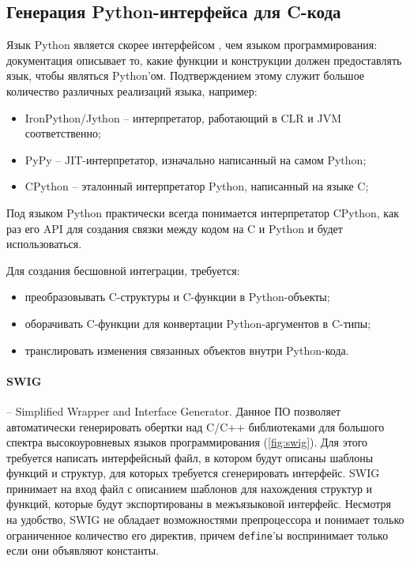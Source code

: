 \subsection{Генерация Python-интерфейса для C-кода}\label{sec:ch2/sec2/sub3/sub1}

Язык Python является скорее интерфейсом \cite{python-is-interface}, чем языком программирования:
документация описывает то, какие функции и конструкции должен предоставлять язык, чтобы являться Python'ом.
Подтверждением этому служит большое количество различных реализаций языка, например:
\begin{itemize}
    \item IronPython/Jython -- интерпретатор, работающий в CLR и JVM соответственно;
    \item PyPy -- JIT-интерпретатор, изначально написанный на самом Python;
    \item CPython \cite{cpython} -- эталонный интерпретатор Python, написанный на языке C;
\end{itemize}

Под языком Python практически всегда понимается интерпретатор CPython, как раз его
API для создания связки между кодом на C и Python и будет использоваться.

Для создания бесшовной интеграции, требуется:
\begin{itemize}
    \item преобразовывать C-структуры и C-функции в Python-объекты;
    \item оборачивать C-функции для конвертации Python-аргументов в C-типы;
    \item транслировать изменения связанных объектов внутри Python-кода.
\end{itemize}

\paragraph{SWIG} \cite{swig} --  Simplified Wrapper and Interface Generator.
Данное ПО позволяет автоматически генерировать обертки над C/C++ библиотеками для
большого спектра высокоуровневых языков программирования (\cref{fig:swig}).
Для этого требуется написать интерфейсный файл, в котором будут описаны шаблоны
функций и структур, для которых требуется сгенерировать интерфейс.
SWIG принимает на вход файл с описанием шаблонов для нахождения структур и
функций, которые будут экспортированы в межъязыковой интерфейс.
Несмотря на удобство, SWIG не обладает возможностями препроцессора и понимает
только ограниченное количество его директив, причем \texttt{define}'ы воспринимает
только если они объявляют константы.

